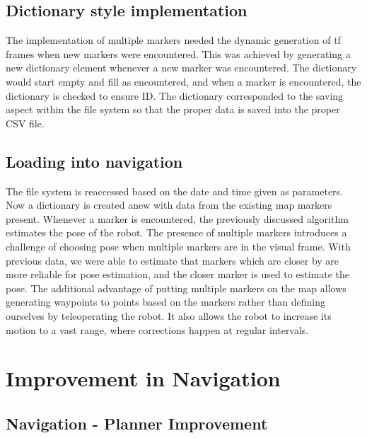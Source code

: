 \documentclass[12pt]{article}
\begin{document}
\subsection{Dictionary style implementation}
\par The implementation of multiple markers needed the dynamic generation of tf frames when new markers were encountered. This was achieved by generating a new dictionary element whenever a new marker was encountered. The dictionary would start empty and fill as encountered, and when a marker is encountered, the dictionary is checked to ensure ID. The dictionary corresponded to the saving aspect within the file system so that the proper data is saved into the proper CSV file.

\subsection{Loading into navigation}
\par The file system is reaccessed based on the date and time given as parameters. Now a dictionary is created anew with data from the existing map markers present. Whenever a marker is encountered, the previously discussed algorithm estimates the pose of the robot. The presence of multiple markers introduces a challenge of choosing pose when multiple markers are in the visual frame. With previous data, we were able to estimate that markers which are closer by are more reliable for pose estimation, and the closer marker is used to estimate the pose. The additional advantage of putting multiple markers on the map allows generating waypoints to points based on the markers rather than defining ourselves by teleoperating the robot. It also allows the robot to increase its motion to a vast range, where corrections happen at regular intervals.
\newpage

\section{Improvement in Navigation}

\subsection{Navigation - Planner Improvement}
\end{document}
